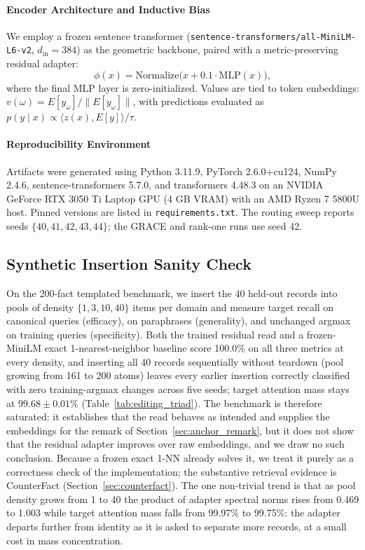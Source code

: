 \documentclass[preprint,12pt]{elsarticle}
\newcommand{\rev}[1]{#1}
\begin{document}
\paragraph{Encoder Architecture and Inductive Bias}
We employ a frozen sentence transformer (\texttt{sentence-transformers/all-MiniLM-L6-v2}, $d_{\mathrm{in}} = 384$) as the geometric backbone, paired with a metric-preserving residual adapter:
\[
  \phi(x) = \mathrm{Normalize}\big( x + 0.1 \cdot \mathrm{MLP}(x) \big),
\]
where the final MLP layer is zero-initialized. Values are tied to token embeddings: $v(\omega) = E[y_\omega] / \|E[y_\omega]\|$, with predictions evaluated as $p(y \mid x) \propto \langle z(x), E[y] \rangle / \tau$.

\paragraph{Reproducibility Environment}
Artifacts were generated using Python 3.11.9, PyTorch 2.6.0+cu124, NumPy 2.4.6, sentence-transformers 5.7.0, and transformers 4.48.3 on an NVIDIA GeForce RTX 3050 Ti Laptop GPU (4 GB VRAM) with an AMD Ryzen 7 5800U host. Pinned versions are listed in \texttt{requirements.txt}. The routing sweep reports seeds $\{40,41,42,43,44\}$; the GRACE and rank-one runs use seed 42.

\subsection{Synthetic Insertion Sanity Check}
\label{sec:synthetic_insertion}

On the 200-fact templated benchmark, we insert the 40 held-out records into pools of density $\{1,3,10,40\}$ items per domain and measure target recall on canonical queries (efficacy), on paraphrases (generality), and unchanged argmax on training queries (specificity). Both the trained residual read and a frozen-MiniLM exact 1-nearest-neighbor baseline score 100.0\% on all three metrics at every density, and inserting all 40 records sequentially without teardown (pool growing from 161 to 200 atoms) leaves every earlier insertion correctly classified with zero training-argmax changes across five seeds; target attention mass stays at $99.68\pm0.01\%$ (Table~\ref{tab:editing_triad}). The benchmark is therefore saturated: it establishes that the read behaves as intended and supplies the embeddings for the remark of Section~\ref{sec:anchor_remark}, but it does not show that the residual adapter improves over raw embeddings, and we draw no such conclusion. \rev{Because a frozen exact 1-NN already solves it, we treat it purely as a correctness check of the implementation; the substantive retrieval evidence is CounterFact (Section~\ref{sec:counterfact}).} The one non-trivial trend is that as pool density grows from 1 to 40 the product of adapter spectral norms rises from 0.469 to 1.003 while target attention mass falls from 99.97\% to 99.75\%: the adapter departs further from identity as it is asked to separate more records, at a small cost in mass concentration.
\end{document}
